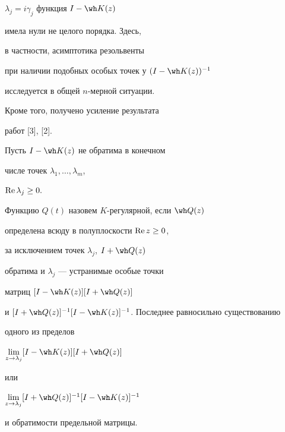 $\lambda_j=i\gamma_j$ функция $I-\wh K(z)$


имела нули не целого порядка. Здесь,


в частности, асимптотика резольвенты


при наличии подобных особых точек у $(I-\wh K(z))^{-1}$


исследуется в общей $n$-мерной ситуации.


Кроме того, получено усиление результата


работ [3], [2].





Пусть $I-\wh K(z)$ не обратима в конечном 


числе точек $\lambda_1,\dotsc,\lambda_m$,


$\operatorname{Re} \lambda_j \geq 0.$


Функцию $Q(t)$ назовем $K$-регулярной, если $\wh Q(z)$


определена всюду в полуплоскости $\operatorname{Re} z\geq 0$,


за исключением точек $\lambda_j$, $I+\wh Q(z)$


обратима и $\lambda_j$ --- устранимые особые точки


матриц $[I-\wh K(z)][I+\wh Q(z)]$


и $[I+\wh Q(z)]^{-1}[I-\wh K(z)]^{-1}$. Последнее равносильно существованию


одного из пределов


$\lim\limits_{z\rightarrow \lambda_j } [I-\wh K(z)][I+\wh Q(z)]$


или


$\lim\limits_{z\rightarrow \lambda_j } [I+\wh Q(z)]^{-1}[I-\wh K(z)]^{-1}$


и обратимости предельной матрицы.






